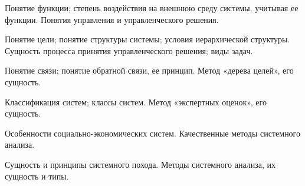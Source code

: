 \documentclass[
	14pt,
	a4paper,
	]
	{scrartcl}
\begin{document}
\vfill

\newpage


\shapk
{}
\setcounter{zad}{0}

\vfill
\z Понятие функции; степень воздействия на внешнюю среду системы, учитывая ее функции.
 \vfill
\z Понятия управления и управленческого решения.
 \vfill

\vfill

\newpage


\shapk
{}
\setcounter{zad}{0}

\vfill
\z Понятие цели; понятие структуры системы; условия иерархической структуры.
 \vfill
\z Сущность процесса принятия управленческого решения; виды задач.
 \vfill

\vfill

\newpage


\shapk
{}
\setcounter{zad}{0}

\vfill
\z Понятие связи; понятие обратной связи, ее принцип.
 \vfill
\z Метод «дерева целей», его сущность.
 \vfill

\vfill

\newpage


\shapk
{}
\setcounter{zad}{0}

\vfill
\z Классификация систем; классы систем.
 \vfill
\z Метод «экспертных оценок», его сущность.
 \vfill

\vfill

\newpage


\shapk
{}
\setcounter{zad}{0}

\vfill
\z Особенности социально-экономических систем.
 \vfill
\z Качественные методы системного анализа.
 \vfill

\vfill

\newpage


\shapk
{}
\setcounter{zad}{0}

\vfill
\z Сущность и принципы системного похода.
 \vfill
\z Методы системного анализа, их сущность и типы.
 \vfill

\vfill

\newpage
\end{document}

